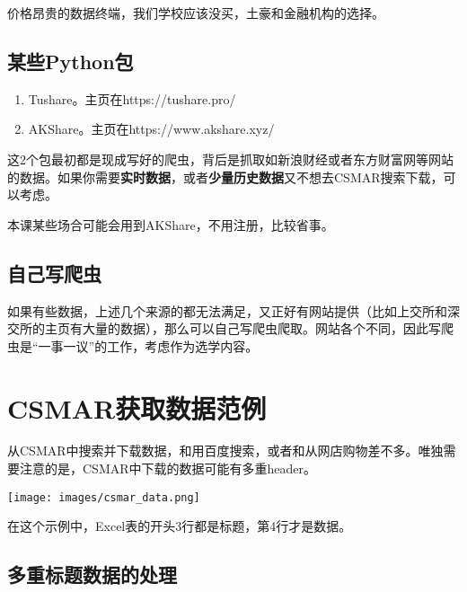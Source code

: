 \documentclass[
  letterpaper,
  DIV=11,
  numbers=noendperiod]{scrreprt}
\providecommand{\tightlist}{%
  \setlength{\itemsep}{0pt}\setlength{\parskip}{0pt}}\usepackage{longtable,booktabs,array}
\begin{document}
价格昂贵的数据终端，我们学校应该没买，土豪和金融机构的选择。

\hypertarget{ux67d0ux4e9bpythonux5305}{%
\subsection{某些Python包}\label{ux67d0ux4e9bpythonux5305}}

\begin{enumerate}
\def\labelenumi{\arabic{enumi}.}
\tightlist
\item
  Tushare。主页在https://tushare.pro/
\item
  AKShare。主页在https://www.akshare.xyz/
\end{enumerate}

这2个包最初都是现成写好的爬虫，背后是抓取如新浪财经或者东方财富网等网站的数据。如果你需要\textbf{实时数据}，或者\textbf{少量历史数据}又不想去CSMAR搜索下载，可以考虑。

本课某些场合可能会用到AKShare，不用注册，比较省事。

\hypertarget{ux81eaux5df1ux5199ux722cux866b}{%
\subsection{自己写爬虫}\label{ux81eaux5df1ux5199ux722cux866b}}

如果有些数据，上述几个来源的都无法满足，又正好有网站提供（比如上交所和深交所的主页有大量的数据），那么可以自己写爬虫爬取。网站各个不同，因此写爬虫是``一事一议''的工作，考虑作为选学内容。

\hypertarget{csmarux83b7ux53d6ux6570ux636eux8303ux4f8b}{%
\section{CSMAR获取数据范例}\label{csmarux83b7ux53d6ux6570ux636eux8303ux4f8b}}

从CSMAR中搜索并下载数据，和用百度搜索，或者和从网店购物差不多。唯独需要注意的是，CSMAR中下载的数据可能有多重header。

\texttt{[image: images/csmar\_data.png]}

在这个示例中，Excel表的开头3行都是标题，第4行才是数据。

\hypertarget{ux591aux91cdux6807ux9898ux6570ux636eux7684ux5904ux7406}{%
\subsection{多重标题数据的处理}\label{ux591aux91cdux6807ux9898ux6570ux636eux7684ux5904ux7406}}
\end{document}
